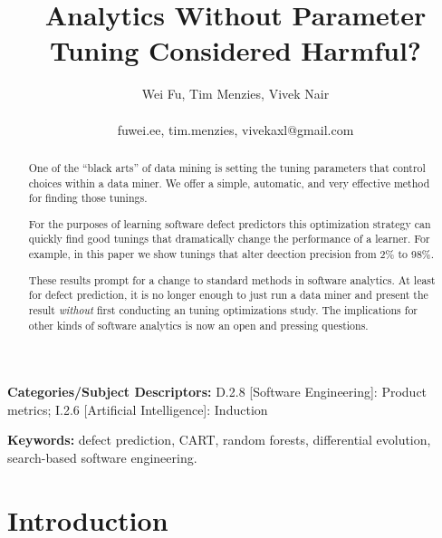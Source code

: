 \documentclass{sig-alternative}
\begin{document}
\title{ Analytics Without Parameter Tuning Considered Harmful?}
\author{\alignauthor Wei Fu, Tim Menzies, Vivek Nair\\
       \\
       fuwei.ee, tim.menzies, vivekaxl@gmail.com}
\maketitle
\begin{abstract}
One of the ``black arts'' of data mining is setting the tuning
parameters that control   choices within a data miner.  We offer a simple,
automatic, and very effective  method for finding those tunings.

For the purposes of learning
software defect predictors this optimization strategy can quickly
find  good tunings that  dramatically change   the performance of a learner.
For example,
in this paper we show   tunings that  alter deection  precision  
 from 2\% to 98\%.

These results prompt for a change to standard methods in software analytics.
At least for defect prediction, 
it is no longer enough to just run a data miner and present the result
{\em without} first conducting an tuning optimizations study.
The implications for other kinds of software analytics is now an open and pressing questions.


\end{abstract}

\vspace{1mm}
\noindent
{\bf Categories/Subject Descriptors:} 
D.2.8 [Software Engineering]: Product metrics;
I.2.6 [Artificial Intelligence]: Induction

 
\vspace{1mm}
\noindent
{\bf Keywords:} defect prediction, CART, random forests,
differential evolution,
search-based software engineering.

\section{Introduction}

\end{document}
